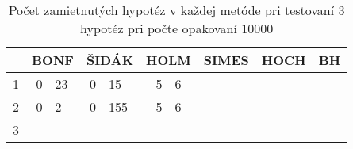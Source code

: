 \begin{table}[h!]
  \centering
  \begin{tabular}{|c|r@{.}l|r@{.}l|r@{.}l|r@{.}l|r@{.}l|r@{.}l|}
    \hline
     & \multicolumn{2}{c}{BONF} & \multicolumn{2}{c}{ŠIDÁK} & \multicolumn{2}{c}{HOLM} 
     & \multicolumn{2}{c}{SIMES} & \multicolumn{2}{c}{HOCH} & \multicolumn{2}{c}{BH} \\ \hline
    1 & 0&23 & 0&15 & 5 & 6\\ \hline
    2 & 0&2 & 0&155 & 5 & 6\\ \hline
    3 & \\ \hline
  \end{tabular}
  \caption{Počet zamietnutých hypotéz v každej metóde pri testovaní $3$ hypotéz 
  pri počte opakovaní $10000$}
  \label{tab04:}
\end{table}